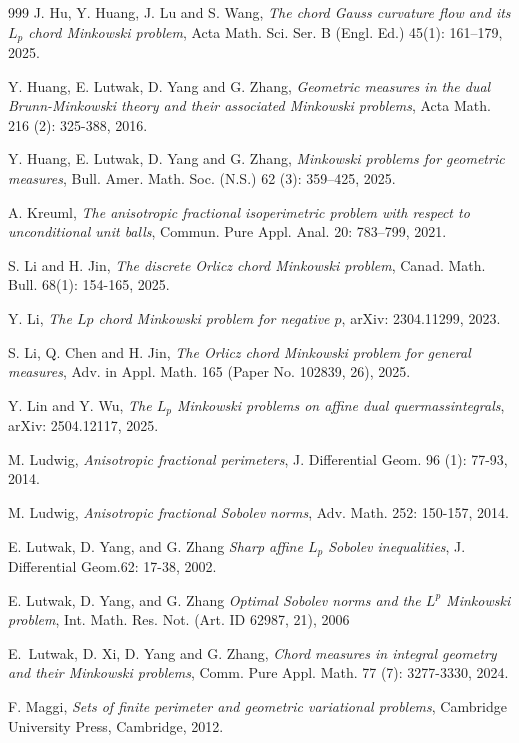 \documentclass[12pt, oneside,reqno]{amsart}
\numberwithin{equation}{section}
\newtheorem{definition and theorem}[theorem]{Definition and Theorem}
\theoremstyle{plain}
\theoremstyle{remark}
\theoremstyle{definition}
\begin{document}
\begin{thebibliography}{999}
J. Hu, Y. Huang, J. Lu and S. Wang,
\emph{The chord {G}auss curvature flow and its {$L_p$} chord {M}inkowski problem},
Acta Math. Sci. Ser. B (Engl. Ed.) 45(1): 161--179, 2025.

Y. Huang, E. Lutwak, D. Yang and G. Zhang,
\emph{Geometric measures in the dual Brunn-Minkowski theory and their associated Minkowski problems},
Acta Math. 216 (2): 325-388, 2016.

Y. Huang, E. Lutwak, D. Yang and G. Zhang,
\emph{Minkowski problems for geometric measures},
Bull. Amer. Math. Soc. (N.S.) 62 (3): 359–425, 2025.

A. Kreuml,
\emph{The anisotropic fractional isoperimetric problem with respect to unconditional unit balls},
Commun. Pure Appl. Anal. 20: 783–799, 2021.

S. Li and H. Jin,
\emph{The discrete {O}rlicz chord {M}inkowski problem},
Canad. Math. Bull. 68(1): 154-165, 2025.

Y. Li,
\emph{The $Lp$ chord Minkowski problem for negative $p$},
arXiv: 2304.11299, 2023.

S. Li, Q. Chen and H. Jin,
\emph{The {O}rlicz chord {M}inkowski problem for general measures},
Adv. in Appl. Math. 165 (Paper No. 102839, 26), 2025.

Y. Lin and Y. Wu,
\emph{The $L_p$ Minkowski problems on affine dual quermassintegrals},
arXiv: 2504.12117, 2025.


M. Ludwig,
\emph{Anisotropic fractional perimeters},
J. Differential Geom. 96 (1): 77-93, 2014.

M. Ludwig,
\emph{Anisotropic fractional Sobolev norms},
Adv. Math. 252: 150-157, 2014.

E. Lutwak, D. Yang, and G. Zhang
\emph{Sharp affine $L_p$ Sobolev inequalities}, J. Differential Geom.62: 17-38, 2002.

E. Lutwak, D. Yang, and G. Zhang
\emph{Optimal {S}obolev norms and the {$L^p$} {M}inkowski problem},
Int. Math. Res. Not. (Art. ID 62987, 21), 2006

E.~Lutwak, D. Xi, D. Yang and G. Zhang,
\emph{Chord measures in integral geometry and their Minkowski problems},
Comm. Pure Appl. Math.  77 (7): 3277-3330, 2024.

F. Maggi,
\emph{Sets of finite perimeter and geometric variational problems},
Cambridge University Press, Cambridge, 2012.


\end{thebibliography}
\end{document}
